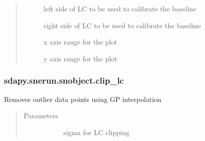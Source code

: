 \documentclass[letterpaper,10pt,english]{sphinxmanual}
\begin{document}
\begin{fulllineitems}
\begin{fulllineitems}
\begin{quote}
\begin{description}
\begin{description}
\item[{}] \leavevmode{[}\sphinxtitleref{float}{]}
left side of LC to be used to calibrate the baseline

\item[{}] \leavevmode{[}\sphinxtitleref{float}{]}
right side of LC to be used to calibrate the baseline

\item[{}] \leavevmode{[}\sphinxtitleref{range}{]}
x axis range for the plot

\item[{}] \leavevmode{[}\sphinxtitleref{range}{]}
y axis range for the plot

\end{description}

\end{description}\end{quote}

\end{fulllineitems}



\subsubsection{sdapy.snerun.snobject.clip\_lc}
\label{\detokenize{generated/sdapy.snerun.snobject.clip_lc:sdapy-snerun-snobject-clip-lc}}\label{\detokenize{generated/sdapy.snerun.snobject.clip_lc::doc}}

\begin{fulllineitems}
\label{\detokenize{generated/sdapy.snerun.snobject.clip_lc:sdapy.snerun.snobject.clip_lc}}
Removes outlier data points using GP interpolation
\begin{quote}\begin{description}
\item[{Parameters}] \leavevmode\begin{description}
\item[{}] \leavevmode{[}\sphinxtitleref{float}{]}
sigma for LC clipping

\end{description}

\end{description}\end{quote}


\end{fulllineitems}
\end{fulllineitems}
\end{document}
